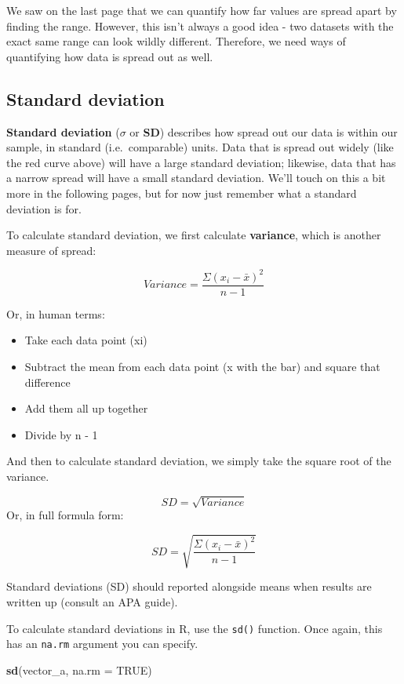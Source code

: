 \documentclass[
]{book}
\newenvironment{Shaded}{\begin{snugshade}}{\end{snugshade}}
\newcommand{\AttributeTok}[1]{\textcolor[rgb]{0.13,0.29,0.53}{#1}}
\newcommand{\ConstantTok}[1]{\textcolor[rgb]{0.56,0.35,0.01}{#1}}
\newcommand{\FunctionTok}[1]{\textcolor[rgb]{0.13,0.29,0.53}{\textbf{#1}}}
\newcommand{\NormalTok}[1]{#1}
\providecommand{\tightlist}{%
  \setlength{\itemsep}{0pt}\setlength{\parskip}{0pt}}
\begin{document}
We saw on the last page that we can quantify how far values are spread apart by finding the range. However, this isn't always a good idea - two datasets with the exact same range can look wildly different. Therefore, we need ways of quantifying how data is spread out as well.

\subsection{Standard deviation}\label{sd}

\textbf{Standard deviation} (\(\sigma\) or \textbf{SD}) describes how spread out our data is within our sample, in standard (i.e.~comparable) units. Data that is spread out widely (like the red curve above) will have a large standard deviation; likewise, data that has a narrow spread will have a small standard deviation. We'll touch on this a bit more in the following pages, but for now just remember what a standard deviation is for.

To calculate standard deviation, we first calculate \textbf{variance}, which is another measure of spread:

\[
 Variance = \frac{\Sigma (x_i - \bar{x} )^2}{n - 1}
\]

Or, in human terms:

\begin{itemize}
\tightlist
\item
  Take each data point (xi)
\item
  Subtract the mean from each data point (x with the bar) and square that difference
\item
  Add them all up together
\item
  Divide by n - 1
\end{itemize}

And then to calculate standard deviation, we simply take the square root of the variance.

\[
SD = \sqrt{Variance}
\]
Or, in full formula form:

\[
SD = \sqrt{\frac{\Sigma (x_i - \bar{x} )^2}{n - 1}}
\]

Standard deviations (SD) should reported alongside means when results are written up (consult an APA guide).

To calculate standard deviations in R, use the \texttt{sd()} function. Once again, this has an \texttt{na.rm} argument you can specify.

\begin{Shaded}
\begin{Highlighting}[]
\FunctionTok{sd}\NormalTok{(vector\_a, }\AttributeTok{na.rm =} \ConstantTok{TRUE}\NormalTok{)}
\end{Highlighting}
\end{Shaded}
\end{document}
